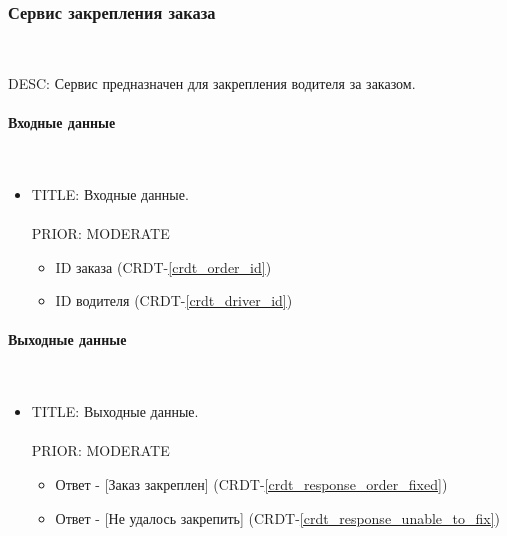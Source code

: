 \subsubsection{Сервис закрепления заказа} \mbox{} \\ \label{fasten_order_service}
  
  DESC: Сервис предназначен для закрепления водителя за заказом.

	\paragraph{Входные данные} \mbox{} \\ \label{}

      \begin{itemize}

        \item{

          TITLE: Входные данные.\\
          \\
          PRIOR: MODERATE\\

        }

        \begin{itemize}
          \item ID заказа (CRDT-\ref{crdt_order_id})
          \item ID водителя (CRDT-\ref{crdt_driver_id})
        \end{itemize}

      \end{itemize}

    \paragraph{Выходные данные} \mbox{} \\

      \begin{itemize}

        \item{

          TITLE: Выходные данные.\\
          \\
          PRIOR: MODERATE\\

        }

        \begin{itemize}
          \item Ответ - [Заказ закреплен] (CRDT-\ref{crdt_response_order_fixed})
          \item Ответ - [Не удалось закрепить] (CRDT-\ref{crdt_response_unable_to_fix})
        \end{itemize}

      \end{itemize}

